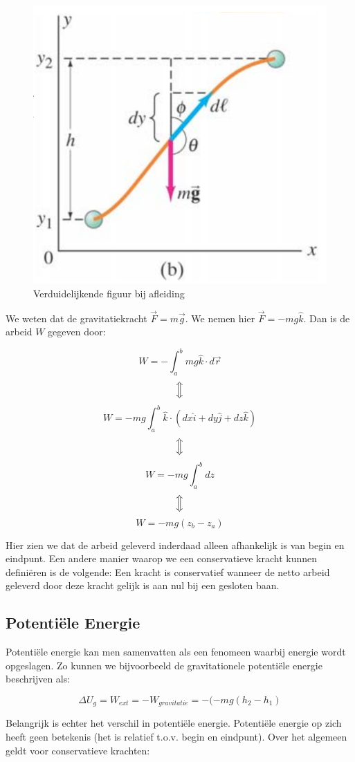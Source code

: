 \documentclass[12pt,a4paper]{article}
\newcommand{\Luda}{\Big\Updownarrow}
\begin{document}
    \begin{figure}[h]
    	\centering
	\includegraphics[width=0.6\linewidth]{zwaartekracht_conservatief}
    	\caption{Verduidelijkende figuur bij afleiding}
        	\label{zwaartekracht_conservatief}
    \end{figure}

    We weten dat de gravitatiekracht $\vec{F} = m\vec{g}$. We nemen hier $\vec{F} = -mg\hat{k}$. 
    Dan is de arbeid $W$ gegeven door:
    
    $$W = -\int_{a}^{b}mg\hat{k} \cdot d\vec{r}$$
    $$\Luda$$
    $$W = -mg\int_{a}^{b}\hat{k}\cdot (dx\hat{i} + dy\hat{j} + dz\hat{k})$$
    $$\Luda$$
    $$W = -mg\int_{a}^{b}dz$$
    $$\Luda$$
    $$W = -mg(z_b - z_a)$$

    Hier zien we dat de arbeid geleverd inderdaad alleen afhankelijk is van begin en eindpunt. Een andere manier waarop
    we een conservatieve kracht kunnen definiëren is de volgende: Een kracht is conservatief wanneer de netto arbeid geleverd
    door deze kracht gelijk is aan nul bij een gesloten baan. 
    
    \subsection{Potentiële Energie}
    Potentiële energie kan men samenvatten als een fenomeen waarbij energie wordt opgeslagen. Zo kunnen we bijvoorbeeld
    de gravitationele potentiële energie beschrijven als:
    
    $$\Delta U_g = W_{ext} = -W_{gravitatie} = -(-mg(h_2 - h_1)$$
    
    Belangrijk is echter het verschil in potentiële energie. Potentiële energie op zich heeft geen betekenis (het is relatief t.o.v.
    begin en eindpunt). Over het algemeen geldt voor conservatieve krachten:
    
\end{document}
